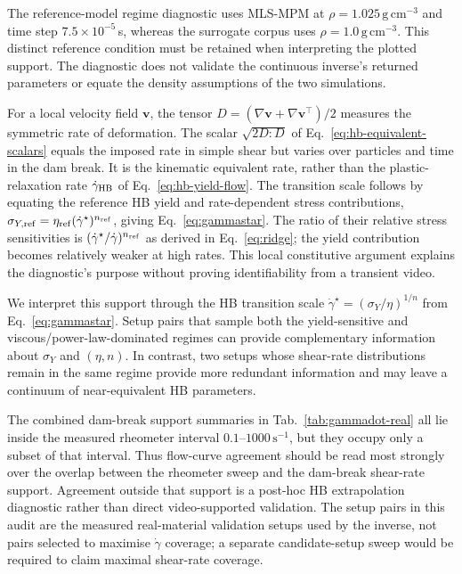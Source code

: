 The reference-model regime diagnostic uses MLS-MPM at
$\rho=1.025\,\mathrm{g\,cm}^{-3}$ and time step
$7.5\times10^{-5}$\,s, whereas the surrogate corpus uses
$\rho=1.0\,\mathrm{g\,cm}^{-3}$. This distinct reference condition
must be retained when interpreting the plotted support. The diagnostic
does not validate the continuous inverse's returned parameters or
equate the density assumptions of the two simulations.

For a local velocity field $\mathbf v$, the tensor
$D=(\nabla\mathbf v+\nabla\mathbf v^\top)/2$ measures the symmetric
rate of deformation. The scalar $\sqrt{2D:D}$ of
Eq.~\eqref{eq:hb-equivalent-scalars} equals the imposed rate in simple
shear but varies over particles and time in the dam break. It is the
kinematic equivalent rate, rather than the plastic-relaxation rate
$\dot\gamma_{\rm HB}$ of Eq.~\eqref{eq:hb-yield-flow}.
The transition scale follows by equating the reference HB yield and
rate-dependent stress contributions,
$\sigma_{Y,\rm ref}=\eta_{\rm ref}(\dot\gamma^\star)^{n_{\rm ref}}$,
giving Eq.~\eqref{eq:gammastar}. The ratio of their relative stress
sensitivities is $(\dot\gamma^\star/\dot\gamma)^{n_{\rm ref}}$
as derived in Eq.~\eqref{eq:ridge}; the yield contribution becomes
relatively weaker at high rates. This local constitutive argument
explains the diagnostic's purpose without proving identifiability
from a transient video.

We interpret this support through the HB transition scale
$\dot\gamma^\star=(\sigma_Y/\eta)^{1/n}$ from
Eq.~\eqref{eq:gammastar}. Setup pairs that sample both the
yield-sensitive and viscous/power-law-dominated regimes can provide
complementary information about $\sigma_Y$ and $(\eta,n)$. In contrast,
two setups whose shear-rate distributions remain in the same regime
provide more redundant information and may leave a continuum of
near-equivalent HB parameters.

The combined dam-break support summaries in Tab.~\ref{tab:gammadot-real} all lie
inside the measured rheometer interval $0.1$--$1000\,\mathrm{s}^{-1}$,
but they occupy only a subset of that interval. Thus flow-curve
agreement should be read most strongly over the overlap between the
rheometer sweep and the dam-break shear-rate support. Agreement outside
that support is a post-hoc HB extrapolation diagnostic rather than
direct video-supported validation. The setup pairs in this audit are
the measured real-material validation setups used by the inverse, not
pairs selected to maximise $\dot\gamma$ coverage; a separate
candidate-setup sweep would be required to claim maximal shear-rate
coverage.

